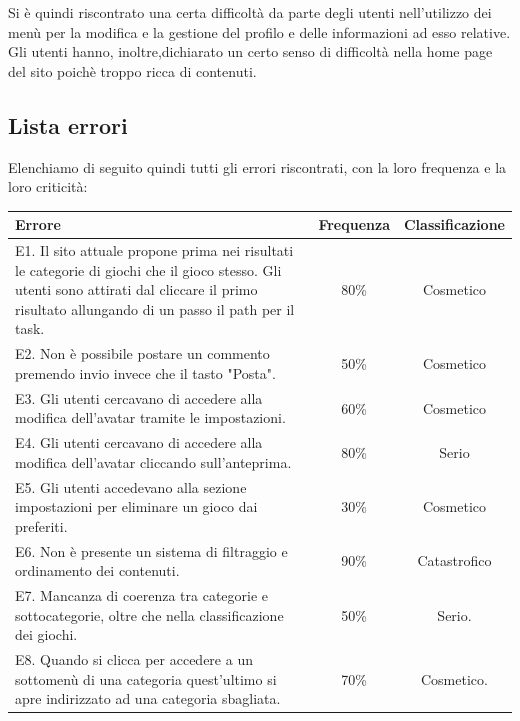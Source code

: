 \documentclass[../Report.tex]{subfiles}
\begin{document}
    Si è quindi riscontrato una certa difficoltà da parte degli utenti nell’utilizzo dei menù per la modifica e la gestione del profilo e delle informazioni ad esso relative. 
    Gli utenti hanno, inoltre,dichiarato un certo senso di difficoltà nella home page del sito poichè troppo ricca di contenuti.
    \subsection{Lista errori}
    Elenchiamo di seguito quindi tutti gli errori riscontrati, con la loro frequenza e la loro criticità:
    \begin{table}[H]
        \begin{tabular}{|p{8cm}|c|c|}
            \hline
            \textbf{Errore} & \textbf{Frequenza} & \textbf{Classificazione} \\
            \hline
            E1. Il sito attuale propone prima nei risultati le categorie di giochi che il gioco stesso. Gli utenti sono attirati dal cliccare il primo risultato allungando di un passo il path per il task. & 80\% & Cosmetico \\
            \hline
            E2. Non è possibile postare un commento premendo invio invece che il tasto "Posta". & 50\% & Cosmetico \\
            \hline
            E3. Gli utenti cercavano di accedere alla modifica dell'avatar tramite le impostazioni. & 60\% & Cosmetico \\
            \hline
            E4. Gli utenti cercavano di accedere alla modifica dell'avatar cliccando sull'anteprima. & 80\% & Serio \\
            \hline
            E5. Gli utenti accedevano alla sezione impostazioni per eliminare un gioco dai preferiti. & 30\% & Cosmetico \\
            \hline 
            E6. Non è presente un sistema di filtraggio e ordinamento dei contenuti. & 90\% & Catastrofico \\
            \hline 
            E7. Mancanza di coerenza tra categorie e sottocategorie, oltre che nella classificazione dei giochi. & 50\% & Serio. \\
            \hline
            E8. Quando si clicca per accedere a un sottomenù di una categoria quest'ultimo si apre indirizzato ad una categoria sbagliata. & 70\% & Cosmetico. \\
            \hline 
        \end{tabular}
    \end{table}
\end{document}
